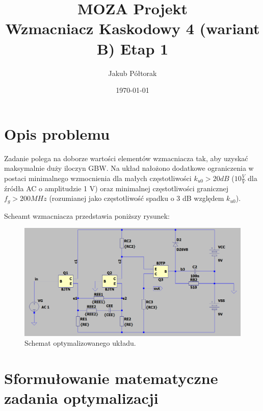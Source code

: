 \documentclass{article}
\title{\huge  \Huge \textbf{MOZA Projekt} \\ \textbf{Wzmacniacz Kaskodowy 4 (wariant B)}}
\date{\today}
\author{ \LARGE Jakub Półtorak}
\begin{document}
\maketitle
{}
\newpage
{}
\tableofcontents

\pagebreak

\begin{center}
    \title{ \huge \textbf{Etap 1}}
    \label{sec:Etap 1}

\end{center}

\section*{Opis problemu}
Zadanie polega na doborze wartości elementów wzmacniacza tak, aby uzyskać maksymalnie duży iloczyn
GBW. Na układ nałożono dodatkowe ograniczenia w postaci minimalnego wzmocnienia dla małych częstotliwości $k_{u0} > 20 dB$ ($10 \frac{V}{V}$ dla źródła AC o amplitudzie 1 V) oraz minimalnej częstotliwości
granicznej $f_g > 200 MHz$ (rozumianej jako częstotliwość spadku o 3 dB względem $k_{u0}$).

Scheamt wzmacniacza przedstawia poniższy rysunek:
\begin{figure}[h]
    \includegraphics[width=12cm]{graphics/KASK4.png}
    \centering
    \caption{Schemat optymalizowanego układu.}
\end{figure}

\section{Sformułowanie matematyczne zadania optymalizacji}
\end{document}
